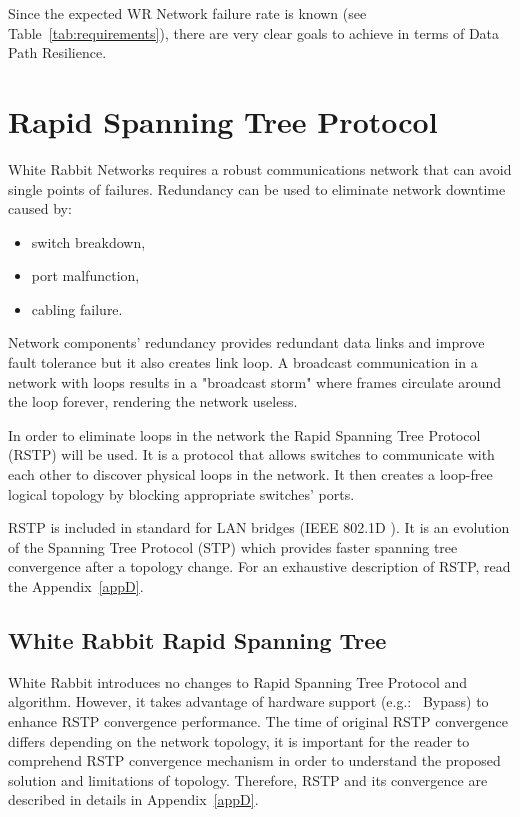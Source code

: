 Since the expected WR Network failure rate is known
(see Table~\ref{tab:requirements}), there are very clear goals to achieve in
terms of Data Path Resilience. 

\section{Rapid Spanning Tree Protocol} 

White Rabbit Networks requires a robust communications network that can avoid 
single points of failures. Redundancy can be used to eliminate network downtime
caused by:
\begin{itemize}
        \item switch breakdown,
        \item port malfunction,
        \item cabling failure.
\end{itemize}
Network components' redundancy provides redundant data links and improve fault
tolerance but it also creates link loop. A broadcast communication in a network
with loops results in a "broadcast storm" where frames circulate around the loop
forever, rendering the network useless.

In order to eliminate loops in the network the Rapid Spanning Tree
Protocol (RSTP) will be used. It is a protocol that allows switches to
communicate with each other to discover physical loops in the network. It then
creates a loop-free logical topology by blocking appropriate switches' ports.

RSTP is included in standard for LAN bridges (IEEE 802.1D \cite{IEEE8021D}). It
is an evolution of the Spanning Tree Protocol (STP) which provides faster
spanning tree convergence after a topology change. For an exhaustive description
of RSTP, read the Appendix~\ref{appD}.


\subsection{White Rabbit Rapid Spanning Tree} 
\label{chapter:WRRSTP}

White Rabbit introduces no changes to Rapid Spanning Tree Protocol and
algorithm. However, it takes advantage of hardware support (e.g.: \HP\ Bypass)
to enhance RSTP convergence performance. The time of original RSTP convergence
differs depending on the network topology, it is important for the reader to
comprehend RSTP convergence mechanism in order to understand the proposed
solution and limitations of topology. Therefore, RSTP and its convergence are
described in details in Appendix~\ref{appD}. 

